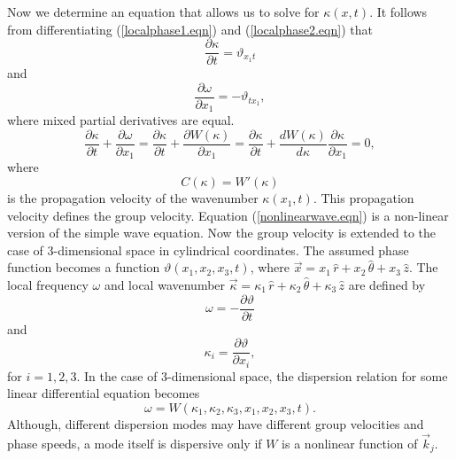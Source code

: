 \documentclass[12pt]{article}
\theoremstyle{definition}
\numberwithin{equation}{section}
\begin{document}
{Now we determine an equation that allows us to solve for $\kappa(x,t)$. It follows from differentiating (\ref{localphase1.eqn}) and (\ref{localphase2.eqn}) that $$\frac{\partial\kappa}{\partial t}=\vartheta_{x_1 t}$$ and $$\frac{\partial\omega}{\partial x_1}=-\vartheta_{tx_1},$$ where mixed partial derivatives are equal.
\begin{equation}
\frac{\partial\kappa}{\partial t}+\frac{\partial\omega}{\partial x_1}=\frac{\partial\kappa}{\partial t}+\frac{\partial W(\kappa)}{\partial x_1}=\frac{\partial\kappa}{\partial t}+\frac{dW(\kappa)}{d\kappa}\frac{\partial\kappa}{\partial x_1}=0,
\label{nonlinearwave.eqn}
\end{equation}
where
$$C(\kappa)=W'(\kappa)$$
is the propagation velocity of the wavenumber $\kappa(x_1,t)$. This propagation velocity defines the group velocity. Equation (\ref{nonlinearwave.eqn}) is a non-linear version of the simple wave equation. Now the group velocity is extended to the case of 3-dimensional space in cylindrical coordinates. The assumed phase function becomes a function $\vartheta(x_1,x_2,x_3,t)$, where $\vec{x}=x_1\,\hat{r}+x_2\,\hat{\theta}+x_3\,\hat{z}$. The local frequency $\omega$ and local wavenumber $\vec{\kappa}=\kappa_1\,\hat{r}+\kappa_2\,\hat{\theta}+\kappa_3\,\hat{z}$ are defined by
\begin{equation}
\omega=-\frac{\partial\vartheta}{\partial t}
\label{groupvelocity1.eqn}
\end{equation}
and
$$\kappa_i=\frac{\partial\vartheta}{\partial x_i},$$
for $i=1,2,3$. In the case of 3-dimensional space, the dispersion relation for some linear differential equation becomes
$$\omega=W(\kappa_1,\kappa_2,\kappa_3,x_1,x_2,x_3,t).$$Although, different dispersion modes may have different group velocities and phase speeds, a mode itself is dispersive only if $W$ is a nonlinear function of $\vec{k}_j$.

}
\end{document}
